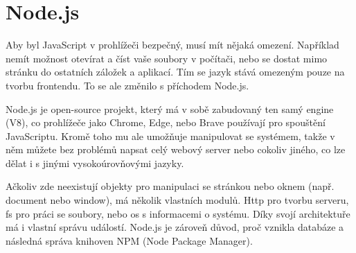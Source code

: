\section{Node.js}

Aby byl JavaScript v prohlížeči bezpečný, musí mít nějaká omezení. Například nemít možnost otevírat a číst vaše soubory v počítači, nebo se dostat mimo stránku do ostatních záložek a aplikací. Tím se jazyk stává omezeným pouze na tvorbu frontendu. To se ale změnilo s příchodem Node.js.\cite{NodeJS}

Node.js je open-source projekt, který má v sobě zabudovaný ten samý engine (V8), co prohlížeče jako Chrome, Edge, nebo Brave používají pro spouštění JavaScriptu. Kromě toho mu ale umožňuje manipulovat se systémem, takže v něm můžete bez problémů napsat celý webový server nebo cokoliv jiného, co lze dělat i s jinými vysokoúrovňovými jazyky.\cite{NodejsWiki}

Ačkoliv zde neexistují objekty pro manipulaci se stránkou nebo oknem (např. document nebo window), má několik vlastních modulů. Http pro tvorbu serveru, fs pro práci se soubory, nebo os s informacemi o systému. Díky svojí architektuře má i vlastní správu událostí. Node.js je zároveň důvod, proč vznikla databáze a následná správa knihoven NPM (Node Package Manager).
